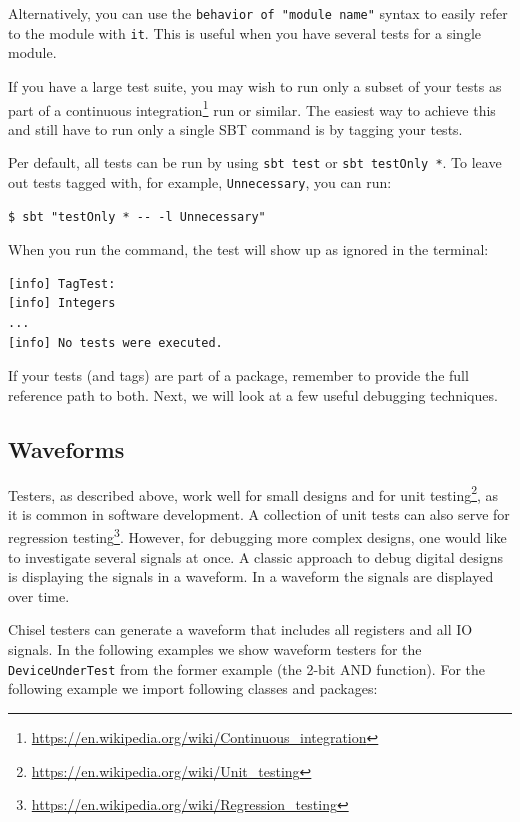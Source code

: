 \documentclass[%
    10pt,
    headinclude, footexclude,
    openright, %
    notitlepage,
    cleardoubleempty,
    headsepline,
    pointlessnumbers,
    bibtotoc, idxtotoc,
    ]{scrbook}
\newcommand{\code}[1]{{\small{\texttt{#1}}}}
\newcommand{\myref}[2]{\href{#1}{#2}}
\renewcommand{\myref}[2]{{#2}{\footnote{\url{#1}}}}
\begin{document}

\noindent Alternatively, you can use the \code{behavior of "module name"} syntax to easily 
refer to the module with \code{it}. This is useful when you have several tests for a 
single module.


\noindent If you have a large test suite, you may wish to run only a subset of your tests 
as part of a \myref{https://en.wikipedia.org/wiki/Continuous_integration}{continuous integration} 
run or similar. The easiest way to achieve this and still have to run only a single SBT command 
is by tagging your tests.


\noindent Per default, all tests can be run by using \code{sbt test} or \code{sbt testOnly *}. 
To leave out tests tagged with, for example, \code{Unnecessary}, you can run:

\begin{verbatim}
$ sbt "testOnly * -- -l Unnecessary"
\end{verbatim}

\noindent When you run the command, the test will show up as ignored in the terminal:

\begin{verbatim}
[info] TagTest:
[info] Integers
...
[info] No tests were executed.
\end{verbatim}

\noindent If your tests (and tags) are part of a package, remember to provide the full 
reference path to both. Next, we will look at a few useful debugging techniques.

\subsection{Waveforms}

Testers, as described above, work well for small designs and for 
\myref{https://en.wikipedia.org/wiki/Unit_testing}{unit testing}, as it is common in
software development. A collection of unit tests can also serve for
\myref{https://en.wikipedia.org/wiki/Regression_testing}{regression testing}. However, 
for debugging more complex designs, one would like to investigate several signals at 
once. A classic approach to debug digital designs is displaying the signals in a 
waveform. In a waveform the signals are displayed over time.

\noindent Chisel testers can generate a waveform that includes all registers and all 
IO signals. In the following examples we show waveform testers for the 
\code{DeviceUnderTest} from the former example (the 2-bit AND function). For the 
following example we import following classes and packages:
\end{document}
